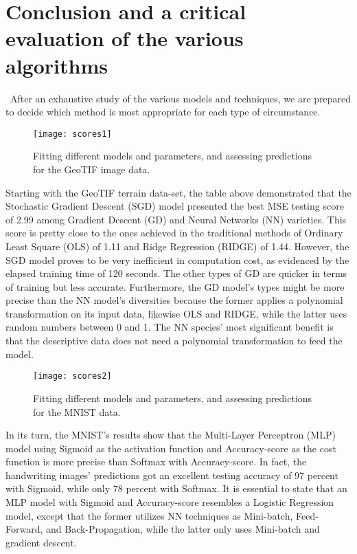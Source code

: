 \section{Conclusion and a critical evaluation of the various algorithms}
\label{chap:Conclusion}

\quad \, After an exhaustive study of the various models and techniques, we are prepared to decide which method is most appropriate for each type of circumstance.\\

\begin{figure}[H]
\label{fig:scores1}
\texttt{[image: scores1]}
\caption{Fitting different models and parameters, and assessing predictions for the GeoTIF image data.}
\end{figure}

Starting with the GeoTIF terrain data-set, the table above demonstrated that the Stochastic Gradient Descent (SGD) model presented the best MSE testing score of 2.99 among Gradient Descent (GD) and Neural Networks (NN) varieties. This score is pretty close to the ones achieved in the traditional methods of Ordinary Least Square (OLS) of 1.11 and Ridge Regression (RIDGE) of 1.44. However, the SGD model proves to be very inefficient in computation cost, as evidenced by the elapsed training time of 120 seconds. The other types of GD are quicker in terms of training but less accurate. Furthermore, the GD model's types might be more precise than the NN model's diversities because the former applies a polynomial transformation on its input data, likewise OLS and RIDGE, while the latter uses random numbers between 0 and 1. The NN species' most significant benefit is that the descriptive data does not need a polynomial transformation to feed the model.

\begin{figure}[H]
\label{fig:scores2}
\texttt{[image: scores2]}
\caption{Fitting different models and parameters, and assessing predictions for the MNIST data.}
\end{figure}

In its turn, the MNIST's results show that the Multi-Layer Perceptron (MLP) model using Sigmoid as the activation function and Accuracy-score as the cost function is more precise than Softmax with Accuracy-score. In fact, the handwriting images' predictions got an excellent testing accuracy of 97 percent with Sigmoid, while only 78 percent with Softmax. It is essential to state that an MLP model with Sigmoid and Accuracy-score resembles a Logistic Regression model, except that the former utilizes NN techniques as Mini-batch, Feed-Forward, and Back-Propagation, while the latter only uses Mini-batch and gradient descent.

